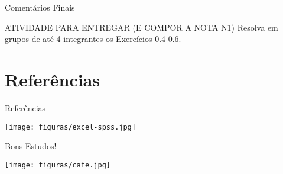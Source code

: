 \documentclass[10pt]{beamer}
\renewcommand{\indent}{\hspace*{2em}}
\theoremstyle{definition}
\begin{document}
\begin{frame}{Comentários Finais}
\begin{alertblock}{ATIVIDADE PARA ENTREGAR (E COMPOR A NOTA N1)}
        \vfill\indent Resolva em grupos de até 4 integrantes os Exercícios 0.4-0.6.
\end{alertblock}
\end{frame}

\section{Referências}

\begin{frame}{Referências}
 \begin{center}
  \texttt{[image: figuras/excel-spss.jpg]}
 \end{center}
\end{frame}

\begin{frame}{Bons Estudos!}
 \begin{center}
  \texttt{[image: figuras/cafe.jpg]}
 \end{center}
\end{frame}


%   
%   

\end{document}
